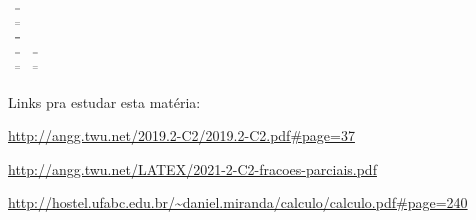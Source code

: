 \documentclass[oneside,12pt]{article}
\begin{document}
\newpage



$\scalebox{0.55}{$
   \begin{array}{l}
   \ga{[RC]} \;=\;  \ga{(RC)} \\ \\[-5pt]
   \ga{[MV1]} \;=\; \ga{(MV1)} \\ \\[-5pt]
   \ga{[MV2]} \;=\; \ga{(MV2)} \\ \\[-5pt]
   \ga{[MV3]} \;=\; \ga{(MV3)}
    \quad
     \ga{[MV4]} \;=\; \ga{(MV4)} \\ \\[-5pt]
   \ga{[MVI3]} \;=\; \ga{(MVI3)}
    \quad
     \ga{[MVI4]} \;=\; \ga{(MVI4)} \\ \\[-5pt]
   \end{array}
 $}
$



\newpage


Links pra estudar esta matéria:

\ssk

{\scriptsize

\url{http://angg.twu.net/2019.2-C2/2019.2-C2.pdf\#page=37}

\url{http://angg.twu.net/LATEX/2021-2-C2-fracoes-parciais.pdf}

\url{http://hostel.ufabc.edu.br/~daniel.miranda/calculo/calculo.pdf\#page=240}

}







\end{document}
